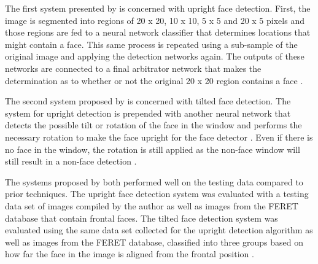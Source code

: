 The first system presented by \cite{rowley1998nn} is concerned with upright face detection. First, the image is segmented into regions of 20 x 20, 10 x 10, 5 x 5 and 20 x 5 pixels and those regions are fed to a neural network classifier that determines locations that might contain a face. This same process is repeated using a sub-sample of the original image and applying the detection networks again. The outputs of these networks are connected to a final arbitrator network that makes the determination as to whether or not the original 20 x 20 region contains a face \cite{rowley1998nn}.

The second system proposed by \cite{rowley1998nn} is concerned with tilted face detection. The system for upright detection is prepended with another neural network that detects the possible tilt or rotation of the face in the window and performs the necessary rotation to make the face upright for the face detector \cite{rowley1998nn}. Even if there is no face in the window, the rotation is still applied as the non-face window will still result in a non-face detection \cite{rowley1998nn}.

The systems proposed by \cite{rowley1998nn} both performed well on the testing data compared to prior techniques. The upright face detection system was evaluated with a testing data set of images compiled by the author as well as images from the FERET database that contain frontal faces. The tilted face detection system was evaluated using the same data set collected for the upright detection algorithm as well as images from the FERET database, classified into three groups based on how far the face in the image is aligned from the frontal position \cite{rowley1998nn}.




%
%


%


